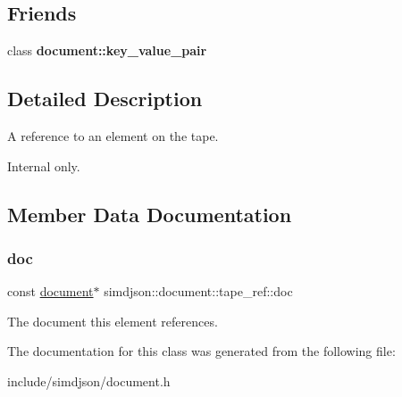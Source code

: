 \subsection*{Friends}
\begin{DoxyCompactItemize}
\item 
\mbox{\label{classsimdjson_1_1document_1_1tape__ref_a4021f5daad7acc0e23662c0c4a4a7af1}} 
class {\bfseries document\+::key\+\_\+value\+\_\+pair}
\end{DoxyCompactItemize}


\subsection{Detailed Description}
A reference to an element on the tape. 

Internal only. 

\subsection{Member Data Documentation}
\mbox{\label{classsimdjson_1_1document_1_1tape__ref_ab67f16e95e949825ef2e6badbf33e806}} 
\subsubsection{\texorpdfstring{doc}{doc}}
{\footnotesize\ttfamily const \hyperlink{classsimdjson_1_1document}{document}$\ast$ simdjson\+::document\+::tape\+\_\+ref\+::doc\hspace{0.3cm}{\ttfamily [protected]}}



The document this element references. 



The documentation for this class was generated from the following file\+:\begin{DoxyCompactItemize}
\item 
include/simdjson/document.\+h\end{DoxyCompactItemize}
